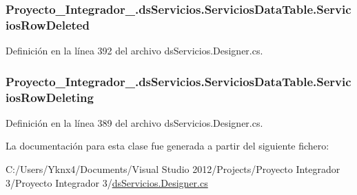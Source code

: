 \hypertarget{class_proyecto___integrador__3_1_1ds_servicios_1_1_servicios_data_table_a7b2809ac1c63557531a1ae77eceb8805}{
\subsubsection[{Servicios\-Row\-Deleted}]{ Proyecto\-\_\-\-Integrador\-\_.\-ds\-Servicios.\-Servicios\-Data\-Table.\-Servicios\-Row\-Deleted}}\label{class_proyecto___integrador__3_1_1ds_servicios_1_1_servicios_data_table_a7b2809ac1c63557531a1ae77eceb8805}


Definición en la línea 392 del archivo ds\-Servicios.\-Designer.\-cs.

\hypertarget{class_proyecto___integrador__3_1_1ds_servicios_1_1_servicios_data_table_a59d056a91ad2ab4905fbe239ff440f9d}{
\subsubsection[{Servicios\-Row\-Deleting}]{ Proyecto\-\_\-\-Integrador\-\_.\-ds\-Servicios.\-Servicios\-Data\-Table.\-Servicios\-Row\-Deleting}}\label{class_proyecto___integrador__3_1_1ds_servicios_1_1_servicios_data_table_a59d056a91ad2ab4905fbe239ff440f9d}


Definición en la línea 389 del archivo ds\-Servicios.\-Designer.\-cs.



La documentación para esta clase fue generada a partir del siguiente fichero\-:\begin{DoxyCompactItemize}
\item 
C\-:/\-Users/\-Yknx4/\-Documents/\-Visual Studio 2012/\-Projects/\-Proyecto Integrador 3/\-Proyecto Integrador 3/\hyperlink{ds_servicios_8_designer_8cs}{ds\-Servicios.\-Designer.\-cs}\end{DoxyCompactItemize}
